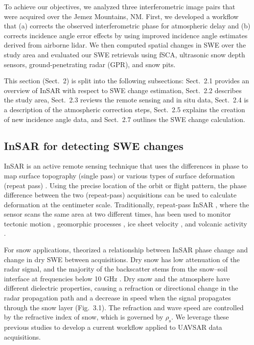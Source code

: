To achieve our objectives, we analyzed three interferometric image pairs that were acquired over the Jemez Mountains, NM. First, we developed a workflow \citep{data1} that (a) corrects the observed interferometric phase for atmospheric delay and (b) corrects incidence angle error effects by using improved incidence angle estimates derived from airborne lidar. We then computed spatial changes in SWE over the study area and evaluated our SWE retrievals using fSCA, ultrasonic snow depth sensors, ground-penetrating radar (GPR), and snow pits.

This section (Sect.~2) is split into the following subsections: Sect.~2.1 provides an overview of InSAR with respect to SWE change estimation, Sect.~2.2 describes the study area, Sect.~2.3 reviews the remote sensing and in situ data, Sect.~2.4 is a description of the atmospheric correction steps, Sect.~2.5 explains the creation of new incidence angle data, and Sect.~2.7 outlines the SWE change calculation.

\hypertarget{ch3-methods-1}{\subsection{InSAR for detecting SWE changes}\label{ch3-methods-1}}


InSAR is an active remote sensing technique that uses the differences in phase to map surface topography (single pass) \citep{zebkerTopographicMappingInterferometric1986} or various types of surface deformation (repeat pass) \citep{goldsteinInterferometricRadarMeasurement1987}. Using the precise location of the orbit or flight pattern, the phase difference between the two (repeat-pass) acquisitions can be used to calculate deformation at the centimeter scale. Traditionally, repeat-pass InSAR \citep{rosenSyntheticApertureRadar2000}, where the sensor scans the same area at two different times, has been used to monitor tectonic motion \citep{funningSurfaceDisplacementsSource2005}, geomorphic processes \citep{colesantiMonitoringLandslidesTectonic2003}, ice sheet velocity \citep{mouginotMappingIceMotion2012}, and volcanic activity \citep{polandVolcanoGeodesyUsing2022}.

For snow applications, \citet{guneriussenInSAREstimationChanges2001} theorized a relationship between InSAR phase change and change in dry SWE between acquisitions. Dry snow has low attenuation of the radar signal, and the majority of the backscatter stems from the snow--soil interface at frequencies below 10 GHz \citep{marshallEstimatingAlpineSnowpack2005,ulabySnowcoverInfluenceBackscattering1984}. Dry snow and the atmosphere have different dielectric properties, causing a refraction or directional change in the radar propagation path and a decrease in speed when the signal propagates through the snow layer (Fig.~3.1). The refraction and wave speed are controlled by the refractive index of snow, which is governed by $\rho_\mathrm{s}$. We leverage these previous studies to develop a current workflow applied to UAVSAR data acquisitions.

